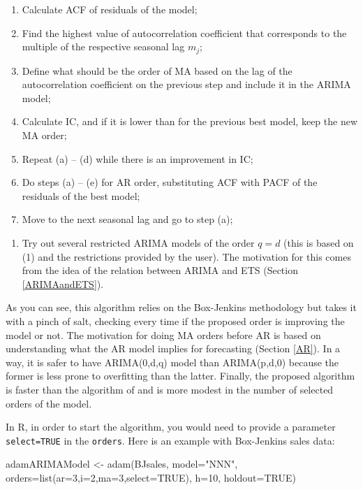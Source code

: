 \documentclass[
]{book}
\newenvironment{Shaded}{\begin{snugshade}}{\end{snugshade}}
\newcommand{\AttributeTok}[1]{\textcolor[rgb]{0.77,0.63,0.00}{#1}}
\newcommand{\ConstantTok}[1]{\textcolor[rgb]{0.00,0.00,0.00}{#1}}
\newcommand{\DecValTok}[1]{\textcolor[rgb]{0.00,0.00,0.81}{#1}}
\newcommand{\FunctionTok}[1]{\textcolor[rgb]{0.00,0.00,0.00}{#1}}
\newcommand{\NormalTok}[1]{#1}
\newcommand{\OtherTok}[1]{\textcolor[rgb]{0.56,0.35,0.01}{#1}}
\newcommand{\StringTok}[1]{\textcolor[rgb]{0.31,0.60,0.02}{#1}}
\providecommand{\tightlist}{%
  \setlength{\itemsep}{0pt}\setlength{\parskip}{0pt}}
\theoremstyle{definition}
\theoremstyle{definition}
\theoremstyle{definition}
\theoremstyle{definition}
\theoremstyle{remark}
\begin{document}
\begin{enumerate}
\def\labelenumi{\alph{enumi}.}
\tightlist
\item
  Calculate ACF of residuals of the model;
\item
  Find the highest value of autocorrelation coefficient that corresponds to the multiple of the respective seasonal lag \(m_j\);
\item
  Define what should be the order of MA based on the lag of the autocorrelation coefficient on the previous step and include it in the ARIMA model;
\item
  Calculate IC, and if it is lower than for the previous best model, keep the new MA order;
\item
  Repeat (a) -- (d) while there is an improvement in IC;
\item
  Do steps (a) -- (e) for AR order, substituting ACF with PACF of the residuals of the best model;
\item
  Move to the next seasonal lag and go to step (a);
\end{enumerate}

\begin{enumerate}
\def\labelenumi{\arabic{enumi}.}
\setcounter{enumi}{2}
\tightlist
\item
  Try out several restricted ARIMA models of the order \(q=d\) (this is based on (1) and the restrictions provided by the user). The motivation for this comes from the idea of the relation between ARIMA and ETS (Section \ref{ARIMAandETS}).
\end{enumerate}

As you can see, this algorithm relies on the Box-Jenkins methodology but takes it with a pinch of salt, checking every time if the proposed order is improving the model or not. The motivation for doing MA orders before AR is based on understanding what the AR model implies for forecasting (Section \ref{AR}). In a way, it is safer to have ARIMA(0,d,q) model than ARIMA(p,d,0) because the former is less prone to overfitting than the latter. Finally, the proposed algorithm is faster than the algorithm of \citet{Svetunkov2019} and is more modest in the number of selected orders of the model.

In R, in order to start the algorithm, you would need to provide a parameter \texttt{select=TRUE} in the \texttt{orders}. Here is an example with Box-Jenkins sales data:

\begin{Shaded}
\begin{Highlighting}[]
\NormalTok{adamARIMAModel }\OtherTok{\textless{}{-}} \FunctionTok{adam}\NormalTok{(BJsales, }\AttributeTok{model=}\StringTok{"NNN"}\NormalTok{,}
                       \AttributeTok{orders=}\FunctionTok{list}\NormalTok{(}\AttributeTok{ar=}\DecValTok{3}\NormalTok{,}\AttributeTok{i=}\DecValTok{2}\NormalTok{,}\AttributeTok{ma=}\DecValTok{3}\NormalTok{,}\AttributeTok{select=}\ConstantTok{TRUE}\NormalTok{),}
                       \AttributeTok{h=}\DecValTok{10}\NormalTok{, }\AttributeTok{holdout=}\ConstantTok{TRUE}\NormalTok{)}
\end{Highlighting}
\end{Shaded}
\end{document}
